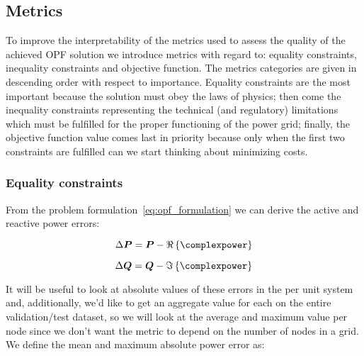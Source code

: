 \subsection*{Metrics}
To improve the interpretability of the metrics used to assess the quality of the achieved OPF solution
we introduce metrics with regard to: equality constraints, inequality constraints and objective function.
The metrics categories are given in descending order with respect to importance.
Equality constraints are the most important because the solution must obey the laws of physics;
then come the inequality constraints representing the technical (and regulatory) limitations
which must be fulfilled for the proper functioning of the power grid;
finally, the objective function value comes last in priority because only when the
first two constraints are fulfilled can we start thinking about minimizing costs.

\subsubsection*{Equality constraints}
From the problem formulation~\ref{eq:opf_formulation} we can derive the active and reactive power errors:

\begin{equation}
    \label{eq:active_power_error}
    \Delta \boldsymbol{P} = \boldsymbol{P} - \Re\left\{ \complexpower \right\}
\end{equation}

\begin{equation}
    \label{eq:reactive_power_error}
    \Delta \boldsymbol{Q} = \boldsymbol{Q} - \Im\left\{ \complexpower \right\}
\end{equation}

\noindent It will be useful to look at absolute values of these errors in the per unit system and, additionally, we'd like to get an aggregate value
for each on the entire validation/test dataset, so we will look at the average and maximum value
per node since we don't want the metric to depend on the number of nodes in a grid.
We define the mean and maximum absolute power error as:

\newcommand{\abs}[1]{\left| #1 \right|}

\newcommand{\expectedvalue}[1]{\mathbb{E} \left\{#1\right\}}

\newcommand{\expectedabsvalue}[1]{\expectedvalue{\abs{#1}}}

\newcommand{\expectedrelativeabsvalue}[1]{\expectedabsvalue{\frac{\Delta #1}{#1}}}


